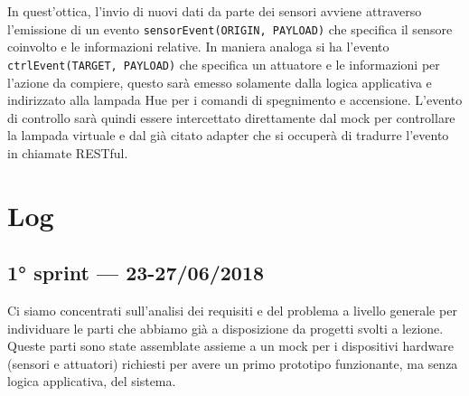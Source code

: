 In quest'ottica, l'invio di nuovi dati da parte dei sensori avviene attraverso l'emissione di un evento \texttt{sensorEvent(ORIGIN, PAYLOAD)} che specifica il sensore coinvolto e le informazioni relative. In maniera analoga si ha l'evento \texttt{ctrlEvent(TARGET, PAYLOAD)} che specifica un attuatore e le informazioni per l'azione da compiere, questo sarà emesso solamente dalla logica applicativa e indirizzato alla lampada Hue per i comandi di spegnimento e accensione. L'evento di controllo sarà quindi essere intercettato direttamente dal mock per controllare la lampada virtuale e dal già citato adapter che si occuperà di tradurre l'evento in chiamate RESTful.

\section{Log}

\subsection{1° sprint –– 23-27/06/2018}
Ci siamo concentrati sull'analisi dei requisiti e del problema a livello generale per individuare le parti che abbiamo già a disposizione da progetti svolti a lezione. Queste parti sono state assemblate assieme a un mock per i dispositivi hardware (sensori e attuatori) richiesti per avere un primo prototipo funzionante, ma senza logica applicativa, del sistema.


